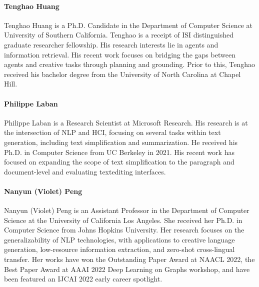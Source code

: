 \documentclass[11pt]{article}
\begin{document}
\paragraph{Tenghao Huang} Tenghao Huang is a Ph.D. Candidate in the Department of Computer Science at University of Southern California. Tenghao is a receipt of ISI distinguished graduate researcher fellowship. His research interests lie in agents and information retrieval. His recent work focuses on bridging the gaps between agents and creative tasks through planning and grounding. Prior to this, Tenghao received his bachelor degree from the University of North Carolina at Chapel Hill. 

\paragraph{Philippe Laban} Philippe Laban is a Research Scientist at Microsoft Research. His research is at the intersection of NLP and HCI, focusing on several tasks within text generation, including text simplification and summarization. He received his Ph.D. in Computer Science from UC Berkeley in 2021. His recent work has focused on expanding the scope of text simplification to the paragraph and document-level and evaluating textediting interfaces. 

\paragraph{Nanyun (Violet) Peng} Nanyun (Violet) Peng is an Assistant Professor in the Department of Computer Science at the University of California Los Angeles. She received her Ph.D. in Computer Science from Johns Hopkins University. Her research focuses on the generalizability of NLP technologies, with applications to creative language generation, low-resource information extraction, and zero-shot cross-lingual transfer. Her works have won the Outstanding Paper Award at NAACL 2022, the Best Paper Award at AAAI 2022 Deep Learning on Graphs workshop, and have been featured an IJCAI 2022 early career spotlight.


\end{document}
